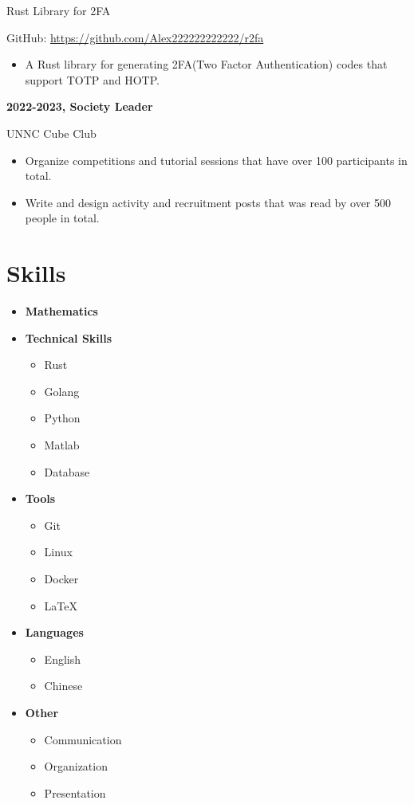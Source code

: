 \documentclass{article}
\begin{document}
    \noindent Rust Library for 2FA

    \noindent GitHub: \href{https://github.com/Alex222222222222/r2fa}{https://github.com/Alex222222222222/r2fa}
    \begin{itemize}
        \item A Rust library for generating 2FA(Two Factor Authentication) codes that support TOTP and HOTP.
    \end{itemize}

    \noindent\textbf{2022-2023, Society Leader}
    
    \noindent UNNC Cube Club
    \begin{itemize}
            \item Organize competitions and tutorial sessions that have over 100 participants in total.
            \item Write and design activity and recruitment posts that was read by over 500 people in total.
    \end{itemize}

\section*{Skills}
    \begin{itemize}[leftmargin=*]
        \item \textbf{Mathematics}
        \item \textbf{Technical Skills}
        \begin{itemize}
            \item Rust
            \item Golang
            \item Python
            \item Matlab
            \item Database
        \end{itemize}
        \item \textbf{Tools}
        \begin{itemize}
            \item Git
            \item Linux
            \item Docker
            \item \LaTeX
        \end{itemize}
        \item \textbf{Languages}
        \begin{itemize}
            \item English
            \item Chinese
        \end{itemize}
        \item \textbf{Other}
        \begin{itemize}
            \item Communication
            \item Organization
            \item Presentation
        \end{itemize}
    \end{itemize}
\end{document}
